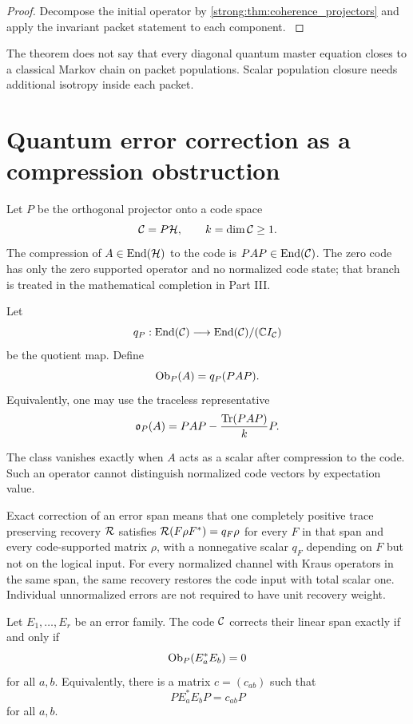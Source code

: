 \begin{proof}\label{strong:proof:038}
Decompose the initial operator by \cref{strong:thm:coherence_projectors} and apply the invariant packet statement to each component.
\label{strong:proof:038:end}\end{proof}

The theorem does not say that every diagonal quantum master equation closes to a classical Markov chain on packet populations. Scalar population closure needs additional isotropy inside each packet.

\section{Quantum error correction as a compression obstruction}\label{strong:section:008}\label{strong:sec:qec}

Let \(P\) be the orthogonal projector onto a code space
\[
\mathcal C=P\mathcal H,
\qquad
k=\dim\mathcal C\ge1.
\]
The compression of \(A\in\operatorname{End}(\mathcal H)\) to the code is \(PAP\in\operatorname{End}(\mathcal C)\). The zero code has only the zero supported operator and no normalized code state; that branch is treated in the mathematical completion in Part III.

\begin{definition}\label{strong:definition:005}\label{strong:def:code_obstruction}
Let
\[
q_P:\operatorname{End}(\mathcal C)\longrightarrow\operatorname{End}(\mathcal C)/(\mathbb C I_{\mathcal C})
\]
be the quotient map. Define
\[
\operatorname{Ob}_P(A)=q_P(PAP).
\]
Equivalently, one may use the traceless representative
\[
\mathfrak o_P(A)
=
PAP-
\frac{\operatorname{Tr}(PAP)}{k}P.
\]
\end{definition}

The class vanishes exactly when \(A\) acts as a scalar after compression to the code. Such an operator cannot distinguish normalized code vectors by expectation value.

Exact correction of an error span means that one completely positive trace preserving recovery $\mathcal R$ satisfies $\mathcal R(F\rho F^*)=q_F\rho$ for every $F$ in that span and every code-supported matrix $\rho$, with a nonnegative scalar $q_F$ depending on $F$ but not on the logical input. For every normalized channel with Kraus operators in the same span, the same recovery restores the code input with total scalar one. Individual unnormalized errors are not required to have unit recovery weight.

\begin{theorem}\label{strong:theorem:026}\label{strong:thm:kl_obstruction}
Let \(E_1,\ldots,E_r\) be an error family. The code \(\mathcal C\) corrects their linear span exactly if and only if
\[
\operatorname{Ob}_P(E_a^*E_b)=0
\]
for all \(a,b\). Equivalently, there is a matrix \(c=(c_{ab})\) such that
\[
PE_a^*E_bP=c_{ab}P
\]
for all \(a,b\).
\end{theorem}

